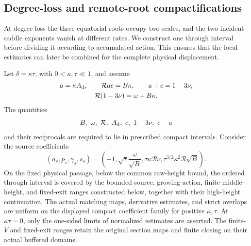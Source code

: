 \subsection{Degree-loss and remote-root compactifications}
\label{subsec:deg-degree-drop}

At degree loss the three equatorial roots occupy two scales, and the two
incident saddle exponents vanish at different rates. We construct one
through interval before dividing it according to accumulated action.
This ensures that the local estimates can later be combined for the
complete physical displacement.

\begin{proposition}\label{deg:prop-degree-drop}
Let \(\delta=\kappa\tau\), with \(0<\kappa,\tau\ll1\), and assume
\begin{equation}
 \begin{gathered}
 a=\kappa A_{\rm d},\qquad
 \mathcal R a c=B\kappa,\qquad
 a+c=1-3\nu,\\
 \mathcal R(1-3\nu)=\omega+B\kappa .
 \end{gathered}
 \label{deg:degree-graph}
\end{equation}
The quantities
\[
 B,\ \omega,\ \mathcal R,\ A_{\rm d},\ c,\ 1-3\nu,\ c-a
\]
and their reciprocals are required to lie in prescribed compact
intervals.  Consider the source coefficients
\begin{equation}
 (a_s,p_s,\gamma_s,s_s)=
 \left(-1,\sqrt\tau\frac{\omega}{\sqrt B},
       \tau\kappa\mathcal R\nu,
       \tau^{3/2}\kappa^2\mathcal R\sqrt B\right).
 \label{deg:degree-source}
\end{equation}
On the fixed physical passage, below the common raw-height bound, the
ordered through interval is covered by the bounded-source, growing-action,
finite-middle-height, and fixed-exit ranges constructed below, together
with their high-height continuation. The actual matching maps,
derivative estimates, and strict overlaps are uniform on the displayed
compact coefficient family for positive \(\kappa,\tau\). At
\(\kappa\tau=0\), only the one-sided limits of normalized estimates
are asserted. The finite-\(V\) and fixed-exit ranges retain the original
section maps and finite closing on their actual buffered domains.
\end{proposition}

